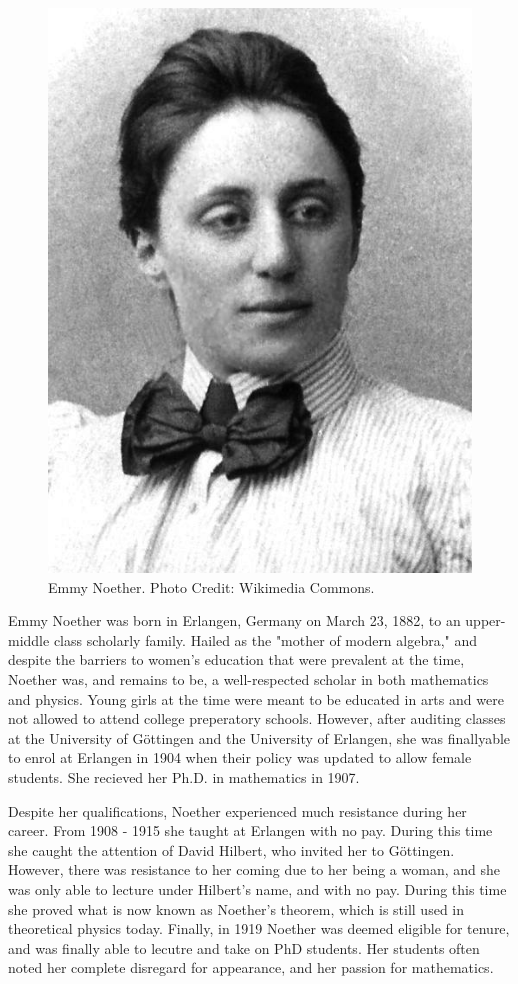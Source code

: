 \documentclass[../../../include/open-logic-section]{subfiles}
\begin{document}
\begin{figure}[h!] 
\centering 
\includegraphics[scale=1.25]{emmy-noether.png}
\caption{Emmy Noether. Photo Credit: Wikimedia Commons.} 
\end{figure}
 Emmy
Noether was born in Erlangen, Germany on March 23, 1882, to an upper-middle
class scholarly family. Hailed as the "mother of modern algebra," and
despite the barriers to women's education that were prevalent at the time,
Noether was, and remains to be, a well-respected scholar in both
mathematics and physics. Young girls at the time were meant to be educated
in arts and were not allowed to attend college preperatory schools.
However, after auditing classes at the University of G\"{o}ttingen and the
University of Erlangen, she was finallyable to enrol at Erlangen in 1904
when their policy was updated to allow female students. She recieved her
Ph.D. in mathematics in 1907.

Despite her qualifications, Noether experienced much resistance during her
career. From 1908 - 1915 she taught at Erlangen with no pay. During this
time she caught the attention of David Hilbert, who invited her to
G\"{o}ttingen. However, there was resistance to her coming due to her being
a woman, and she was only able to lecture under Hilbert's name, and with no
pay. During this time she proved what is now known as Noether's theorem,
which is still used in theoretical physics today. Finally, in 1919 Noether
was deemed eligible for tenure, and was finally able to lecutre and take on
PhD students. Her students often noted her complete disregard for
appearance, and her passion for mathematics.
\end{document}
